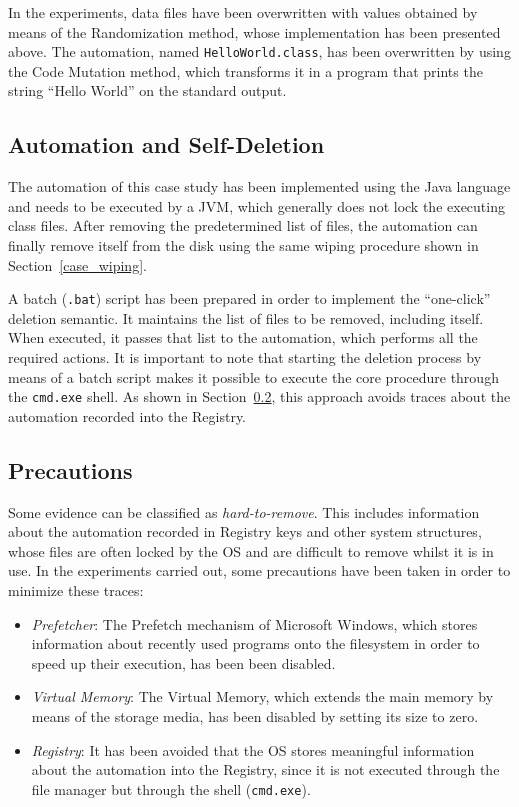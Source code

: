 \documentclass[conference]{IEEEtran}
\begin{document}
In the experiments, data files have been overwritten with values obtained by means of the Randomization method, whose implementation has been presented above. The automation, named \verb=HelloWorld.class=, has been overwritten by using the Code Mutation method, which transforms it in a program that prints the string ``Hello World'' on the standard output.


\subsection{Automation and Self-Deletion}
The automation of this case study has been implemented using the Java language and needs to be executed by a JVM, which generally does not lock the executing class files. After removing the predetermined list of files, the automation can finally remove itself from the disk using the same wiping procedure shown in Section~\ref{case_wiping}.

A batch (\verb=.bat=) script has been prepared in order to implement the ``one-click'' deletion semantic. It maintains the list of files to be removed, including itself. When executed, it passes that list to the automation, which performs all the required actions. It is important to note that starting the deletion process by means of a batch script makes it possible to execute the core procedure through the \verb=cmd.exe= shell. As shown in Section~\ref{prec}, this approach avoids traces about the automation recorded into the Registry.

\subsection{Precautions}
\label{prec}
Some evidence can be classified as \emph{hard-to-remove}. This includes information about the automation recorded in Registry keys and other system structures, whose files are often locked by the OS and are difficult to remove whilst it is in use.
In the experiments carried out, some precautions have been taken in order to minimize these traces:

\begin{itemize}
  \item \emph{Prefetcher}: The Prefetch mechanism of Microsoft Windows, which stores information about recently used programs onto the filesystem in order to speed up their execution, has been been disabled.
  \item \emph{Virtual Memory}: The Virtual Memory, which extends the main memory by means of the storage media, has been disabled by setting its size to zero.
  \item \emph{Registry}: It has been avoided that the OS stores meaningful information about the automation into the Registry, since it is not executed through the file manager but through the shell (\verb=cmd.exe=).
\end{itemize}
\end{document}
